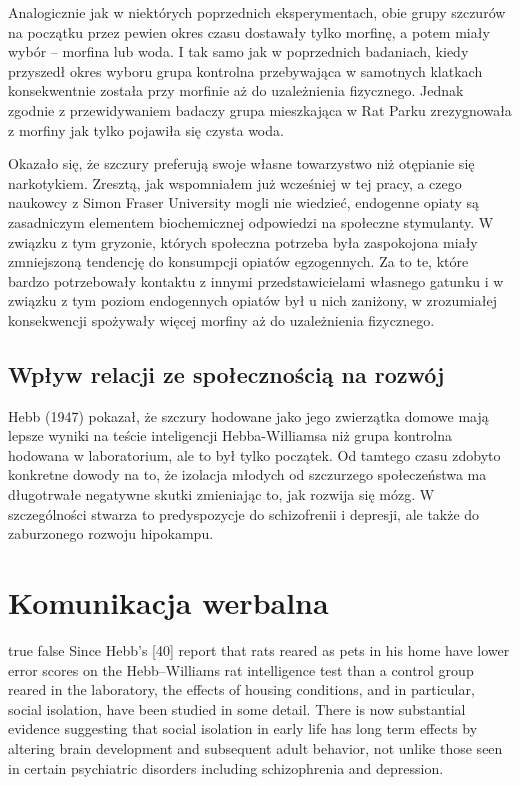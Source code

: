 \documentclass[12pt]{article}
\begin{document}
Analogicznie jak w niektórych poprzednich eksperymentach, obie grupy szczurów na początku przez pewien okres czasu dostawały tylko morfinę, a potem miały wybór -- morfina lub woda. I tak samo jak w poprzednich badaniach, kiedy przyszedł okres wyboru grupa kontrolna przebywająca w samotnych klatkach konsekwentnie została przy morfinie aż do uzależnienia fizycznego. Jednak zgodnie z przewidywaniem badaczy grupa mieszkająca w Rat Parku zrezygnowała z morfiny jak tylko pojawiła się czysta woda.

Okazało się, że szczury preferują swoje własne towarzystwo niż otępianie się narkotykiem. Zresztą, jak wspomniałem już wcześniej w tej pracy, a czego naukowcy z Simon Fraser University mogli nie wiedzieć, endogenne opiaty są zasadniczym elementem biochemicznej odpowiedzi na społeczne stymulanty. W związku z tym gryzonie, których społeczna potrzeba była zaspokojona miały zmniejszoną tendencję do konsumpcji opiatów egzogennych. Za to te, które bardzo potrzebowały kontaktu z innymi przedstawicielami własnego gatunku i w związku z tym poziom endogennych opiatów był u nich zaniżony, w zrozumiałej konsekwencji spożywały więcej morfiny aż do uzależnienia fizycznego.

\subsection{Wpływ relacji ze społecznością na rozwój}

Hebb (1947) pokazał, że szczury hodowane jako jego zwierzątka domowe mają lepsze wyniki na teście inteligencji Hebba-Williamsa niż grupa kontrolna hodowana w laboratorium, ale to był tylko początek. Od tamtego czasu zdobyto konkretne dowody na to, że izolacja młodych od szczurzego społeczeństwa ma długotrwałe negatywne skutki zmieniając to, jak rozwija się mózg. W szczególności stwarza to predyspozycje do schizofrenii i depresji, ale także do zaburzonego rozwoju hipokampu.

\section{Komunikacja werbalna}

\ifx true false
Since  Hebb’s  [40]  report  that  rats
reared as pets in his home have lower error scores on the
Hebb–Williams  rat  intelligence  test  than  a  control  group
reared in the laboratory, the effects of housing conditions,
and  in  particular,  social  isolation,  have  been  studied  in
some detail. There is now substantial evidence suggesting that social isolation in early life has long term effects by
altering brain development and subsequent adult behavior,
not  unlike  those  seen  in  certain  psychiatric  disorders
including schizophrenia and depression. 
\end{document}
